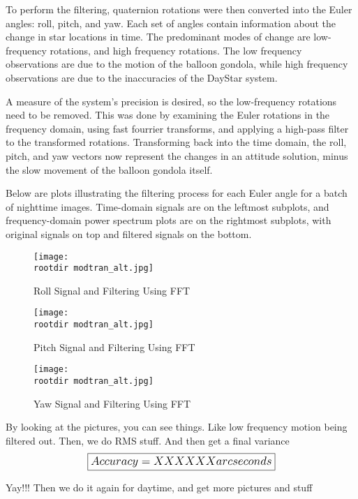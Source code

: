 \documentclass[twocolumn,letterpaper]{IEEEAerospace2012}
\newcommand{\rootdir}{./Figures/}
\begin{document}
To perform the filtering, quaternion rotations were then converted into the Euler angles: roll, pitch, and yaw. Each set of angles contain information about the change in star locations in time. The predominant modes of change are low-frequency rotations, and high frequency rotations. The low frequency observations are due to the motion of the balloon gondola, while high frequency observations are due to the inaccuracies of the DayStar system. 

A measure of the system's precision is desired, so the low-frequency rotations need to be removed. This was done by examining the Euler rotations in the frequency domain, using fast fourrier transforms, and applying a high-pass filter to the transformed rotations. Transforming back into the time domain, the roll, pitch, and yaw vectors now represent the changes in an attitude solution, minus the slow movement of the balloon gondola itself. 

Below are plots illustrating the filtering process for each Euler angle for a batch of nighttime images. Time-domain signals are on the leftmost subplots, and frequency-domain power spectrum plots are on the rightmost subplots, with original signals on top and filtered signals on the bottom.


\begin{figure}
    \label{fig:Roll Filtering}
    \texttt{[image: \\rootdir modtran\_alt.jpg]}
    \caption{Roll Signal and Filtering Using FFT}
\end{figure}

\begin{figure}
    \label{fig:Pitch Filtering}
    \texttt{[image: \\rootdir modtran\_alt.jpg]}
    \caption{Pitch Signal and Filtering Using FFT}
\end{figure}

\begin{figure}
    \label{fig:Yaw Filtering}
    \texttt{[image: \\rootdir modtran\_alt.jpg]}
    \caption{Yaw Signal and Filtering Using FFT}
\end{figure}
  
By looking at the pictures, you can see things. Like low frequency motion being filtered out. Then, we do RMS stuff. And then get a final variance
\begin{displaymath}\large
	\boxed{Accuracy = XXXXXX arcseconds}
\end{displaymath}

Yay!!! Then we do it again for daytime, and get more pictures and stuff
\end{document}
